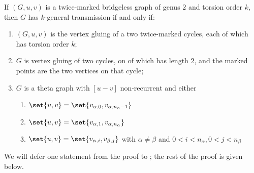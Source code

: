 \begin{theorem}\label{thm:g2general}
    If $(G,u,v)$ is a twice-marked bridgeless graph of genus $2$ and torsion order $k$, then $G$ has $k$-general transmission if and only if:
    \begin{enumerate}[label = \arabic*)]
        \item $(G,u,v)$ is the vertex gluing of a two twice-marked cycles, each of which has torsion order $k$;
       \item $G$ is vertex gluing of two cycles, on of which has length $2$, and the marked points are the two vertices on that cycle;
       \item $G$ is a theta graph with $[u-v]$ non-recurrent and either
       \begin{enumerate}[label = \alph*)]
           \item $\set{u,v} = \set{v_{\alpha,0}, v_{\alpha,n_\alpha-1}}$
           \item $\set{u,v} = \set{v_{\alpha,1}, v_{\alpha,n_\alpha}}$
           \item $\set{u,v} = \set{v_{\alpha,i}, v_{\beta,j}}$ with $\alpha \neq \beta$ and $0<i<n_\alpha,0<j<n_\beta$
       \end{enumerate}
    \end{enumerate}
\end{theorem}

We will defer one statement from the proof to ; the rest of the proof is given below.

